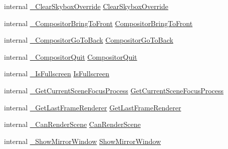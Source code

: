 \begin{DoxyCompactItemize}
\item 
internal \mbox{\hyperlink{struct_valve_1_1_v_r_1_1_i_v_r_compositor_aed1353bac615b802be6754380e30fbf1}{\+\_\+\+Clear\+Skybox\+Override}} \mbox{\hyperlink{struct_valve_1_1_v_r_1_1_i_v_r_compositor_a804bbc949f333e29b412119c82a3b713}{Clear\+Skybox\+Override}}
\item 
internal \mbox{\hyperlink{struct_valve_1_1_v_r_1_1_i_v_r_compositor_a0a02f8e41398d3129dea3bf9ba3a8a25}{\+\_\+\+Compositor\+Bring\+To\+Front}} \mbox{\hyperlink{struct_valve_1_1_v_r_1_1_i_v_r_compositor_ae584ac5635dcc4a157efdf90e5c04662}{Compositor\+Bring\+To\+Front}}
\item 
internal \mbox{\hyperlink{struct_valve_1_1_v_r_1_1_i_v_r_compositor_ad0df5d7509e71103e962c8b331d6cfd5}{\+\_\+\+Compositor\+Go\+To\+Back}} \mbox{\hyperlink{struct_valve_1_1_v_r_1_1_i_v_r_compositor_aa88d54da01f8620a3c0c53c031c0025d}{Compositor\+Go\+To\+Back}}
\item 
internal \mbox{\hyperlink{struct_valve_1_1_v_r_1_1_i_v_r_compositor_a06ecd250e5b6b1b461d10582eb94e16c}{\+\_\+\+Compositor\+Quit}} \mbox{\hyperlink{struct_valve_1_1_v_r_1_1_i_v_r_compositor_a3fa5673221b03129290c0fd5dd9401ed}{Compositor\+Quit}}
\item 
internal \mbox{\hyperlink{struct_valve_1_1_v_r_1_1_i_v_r_compositor_a860925c25ba19ea99a70ab8b080fc57e}{\+\_\+\+Is\+Fullscreen}} \mbox{\hyperlink{struct_valve_1_1_v_r_1_1_i_v_r_compositor_a7cae2a894784dd0fb2302e20d60e7ff8}{Is\+Fullscreen}}
\item 
internal \mbox{\hyperlink{struct_valve_1_1_v_r_1_1_i_v_r_compositor_a5ae9bface8b9a771d2d7240a2b425a7e}{\+\_\+\+Get\+Current\+Scene\+Focus\+Process}} \mbox{\hyperlink{struct_valve_1_1_v_r_1_1_i_v_r_compositor_a7e7b837ace250e8312b5fe1d3353f964}{Get\+Current\+Scene\+Focus\+Process}}
\item 
internal \mbox{\hyperlink{struct_valve_1_1_v_r_1_1_i_v_r_compositor_a907be4acb4579b5ee85ba1c6b455f1ea}{\+\_\+\+Get\+Last\+Frame\+Renderer}} \mbox{\hyperlink{struct_valve_1_1_v_r_1_1_i_v_r_compositor_ad5c9c07736931cc1663a766dfcfa13b0}{Get\+Last\+Frame\+Renderer}}
\item 
internal \mbox{\hyperlink{struct_valve_1_1_v_r_1_1_i_v_r_compositor_a9987f397d90497cfb7dec1feeeab53e4}{\+\_\+\+Can\+Render\+Scene}} \mbox{\hyperlink{struct_valve_1_1_v_r_1_1_i_v_r_compositor_a2b36be4ce964cca2b015912751c4ae15}{Can\+Render\+Scene}}
\item 
internal \mbox{\hyperlink{struct_valve_1_1_v_r_1_1_i_v_r_compositor_a752ed27fd9773cc53b3be5e0d7cd2556}{\+\_\+\+Show\+Mirror\+Window}} \mbox{\hyperlink{struct_valve_1_1_v_r_1_1_i_v_r_compositor_a9c2ff7d65d34419d7160d678f8b57e0a}{Show\+Mirror\+Window}}

\end{DoxyCompactItemize}
